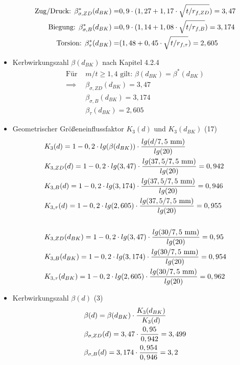 \begin{itemize}
	\begin{align*}
	\text{Zug/Druck: }\beta _{\sigma,ZD} ^* (d_{BK}) =& 0,9 \cdot (1,27 + 1,17 \cdot \sqrt{t/r_{f,ZD}})  = 3,47 \\ 
	\text{Biegung: }\beta _{\sigma,B} ^* (d_{BK}) =& 0,9 \cdot (1,14 + 1,08 \cdot \sqrt{t/r_{f,B}})  = 3,174 \\ 
	\text{Torsion: }\beta _{\tau} ^* (d_{BK}) =& (1,48 + 0,45 \cdot \sqrt{t/r_{f,\tau}})  = 2,605
	\end{align*}
\item Kerbwirkungszahl $\beta (d_{BK}) $ nach Kapitel 4.2.4
	\begin{align*}
	\text{Für } &m/t \ge 1,4 \text{ gilt: } \beta (d_{BK}) = \beta^* (d_{BK}) \\
	\implies &\beta_{\sigma,ZD} (d_{BK}) = 3,47 \\
	&\beta_{\sigma,B}(d_{BK}) = 3,174 \\
	&\beta_{ \tau} (d_{BK})= 2,605 
	\end{align*}
\item Geometrischer Größeneinflussfaktor $K_3 (d) $ und $K_3 (d_{BK}) $ \hfill (17)
	\begin{align*}
	& K_3 (d) = 1-0,2 \cdot lg(\beta (d_{BK})) \cdot \frac{lg(d/7,5 \text{ mm})}{lg(20)}\\
	&K_{3,ZD} (d) = 1-0,2 \cdot lg(3,47) \cdot \frac{lg(37,5/7,5 \text{ mm})}{lg(20)} =0,942\\
	&K_{3,B} (d) = 1-0,2 \cdot lg(3,174) \cdot \frac{lg(37,5/7,5 \text{ mm})}{lg(20)} =0,946\\
	&K_{3,\tau} (d) = 1-0,2 \cdot lg(2,605) \cdot \frac{lg(37,5/7,5 \text{ mm})}{lg(20)} =0,955\\ \\
	&K_{3,ZD} (d_{BK}) = 1-0,2 \cdot lg(3,47) \cdot \frac{lg(30/7,5 \text{ mm})}{lg(20)} =0,95\\
	&K_{3,B} (d_{BK}) = 1-0,2 \cdot lg(3,174) \cdot \frac{lg(30/7,5 \text{ mm})}{lg(20)} =0,954\\
	&K_{3,\tau} (d_{BK}) = 1-0,2 \cdot lg(2,605) \cdot \frac{lg(30/7,5 \text{ mm})}{lg(20)} =0,962
	\end{align*}
\item Kerbwirkungszahl $\beta (d) $ \hfill (3)
	\begin{align*}
	 &\beta (d) = \beta (d_{BK}) \x \frac{K_3 (d_{BK})}{K_3 (d)} \\
	 &\beta_{\sigma,ZD} (d) =  3,47 \x \frac{0,95}{0,942} = 3,499\\
	&\beta_{\sigma,B}(d) = 3,174 \x \frac{0,954}{0,946} =3,2\\

\end{align*}
\end{itemize}

